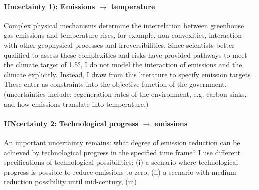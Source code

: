 \paragraph{Uncertainty 1): Emissions $\rightarrow$ temperature}
Complex physical mechanisms determine the interrelation between greenhouse gas emissions and temperature rises, for example, non-convexities, interaction with other geophysical processes and irreversibilities. 
Since scientists better qualified to assess these complexities and risks have provided pathways to meet the climate target of 1.5°, I do not model the interaction of emissions and the climate explicitly. Instead, I draw from this literature to specify emission targets . These enter as constraints into the objective function of the government. (uncertainties include: regeneration rates of the environment, e.g. carbon sinks, and how emissions translate into temperature.)

\paragraph{UNcertainty 2: Technological progress $\rightarrow$ emissions}
An important uncertainty remains: what degree of emission reduction can be achieved by technological progress in the specified time frame? I use different specifications of technological possibilities: (i) a scenario where technological progress is possible to reduce emissions to zero, (ii) a scenario with medium reduction possibility until mid-century, (iii)
